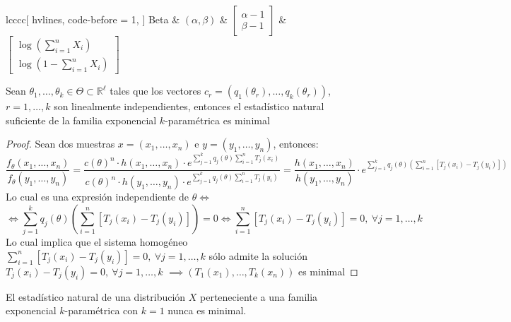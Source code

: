 \begin{table}[h]
\begin{NiceTabular}{lcccc}[
        hvlines, %
        code-before = { 1}, %
    ]
		Beta & \((\alpha, \beta)\) & \({\displaystyle {\begin{bmatrix}\alpha -1\\\beta -1\end{bmatrix}}}\) & \({\displaystyle {\begin{bmatrix}\log \left(\sum_{i = 1}^{n}X_i\right) \\\log \left(1-\sum_{i = 1}^{n}X_i\right) \end{bmatrix}}}\) \\

    \end{NiceTabular}
    \label{tabla:distribuciones}
\end{table}

\begin{teorema}
  Sean $\theta_1, \ldots, \theta_k \in \Theta \subset \mathbb{R}^{\ell}$ tales que los vectores $c_r = (q_1(\theta_r), \ldots, q_k(\theta_r))$, $r = 1, \ldots, k$ son linealmente independientes, entonces el estadístico natural suficiente de la familia exponencial $k$-paramétrica es minimal
\end{teorema}

\begin{proof}
  Sean dos muestras $x = (x_1, \ldots, x_n)$ e $y = (y_1, \ldots, y_n)$, entonces:
  $$\frac{f_{\theta}(x_1, \ldots, x_n)}{f_{\theta}(y_1, \ldots, y_n)} = \frac{c(\theta)^n \cdot h(x_1, \ldots, x_n) \cdot e^{\sum_{j = 1}^{k}q_j(\theta)\sum_{i = 1}^{n}T_j(x_i)}}{c(\theta)^n \cdot h(y_1, \ldots, y_n) \cdot e^{\sum_{j = 1}^{k}q_j(\theta)\sum_{i = 1}^{n}T_j(y_i)}} = \frac{h(x_1, \ldots, x_n)}{h(y_1, \ldots, y_n)} \cdot e^{\sum_{j = 1}^{k}q_j(\theta)\left(\sum_{i = 1}^{n}[T_j(x_i) - T_j(y_i)]\right)}$$
  Lo cual es una expresión independiente de $\theta \iff$
  $$\iff \sum_{j = 1}^{k}q_j(\theta)\left(\sum_{i = 1}^{n}[T_j(x_i) - T_j(y_i)]\right) = 0 \iff \sum_{i = 1}^{n}[T_j(x_i) - T_j(y_i)] = 0, \ \forall j = 1, \ldots, k$$
  Lo cual implica que el sistema homogéneo $\sum_{i = 1}^{n}[T_j(x_i) - T_j(y_i)] = 0, \ \forall j = 1, \ldots, k$ sólo admite la solución $T_j(x_i) - T_j(y_i) = 0, \ \forall j = 1, \ldots, k$ $\implies (T_1(x_1), \ldots, T_k(x_n))$ es minimal
\end{proof}

\begin{observación}
	El estadístico natural de una distribución $X$ perteneciente a una familia exponencial $k$-paramétrica con $k=1$ nunca es minimal.
\end{observación}

